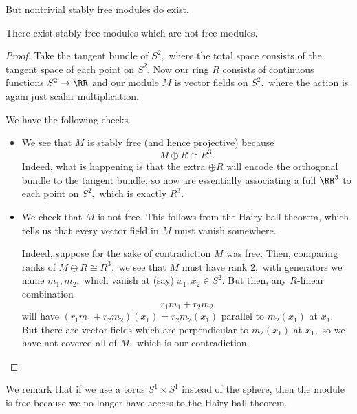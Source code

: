 \documentclass[../notes.tex]{subfiles}
\begin{document}
But nontrivial stably free modules do exist.
\begin{proposition}
	There exist stably free modules which are not free modules.
\end{proposition}
\begin{proof}
	Take the tangent bundle of $S^2,$ where the total space consists of the tangent space of each point on $S^2.$ Now our ring $R$ consists of continuous functions $S^2\to\RR$ and our module $M$ is vector fields on $S^2,$ where the action is again just scalar multiplication.
	
	We have the following checks.
	\begin{itemize}
		\item We see that $M$ is stably free (and hence projective) because
		\[M\oplus R\cong R^3.\]
		Indeed, what is happening is that the extra $\oplus R$ will encode the orthogonal bundle to the tangent bundle, so now are essentially associating a full $\RR^3$ to each point on $S^2,$ which is exactly $R^3.$
		\item We check that $M$ is not free. This follows from the Hairy ball theorem, which tells us that every vector field in $M$ must vanish somewhere.
		
		Indeed, suppose for the sake of contradiction $M$ was free. Then, comparing ranks of $M\oplus R\cong R^3,$ we see that $M$ must have rank $2,$ with generators we name $m_1,m_2,$ which vanish at (say) $x_1,x_2\in S^2.$ But then, any $R$-linear combination
		\[r_1m_1+r_2m_2\]
		will have $(r_1m_1+r_2m_2)(x_1)=r_2m_2(x_1)$ parallel to $m_2(x_1)$ at $x_1.$ But there are vector fields which are perpendicular to $m_2(x_1)$ at $x_1,$ so we have not covered all of $M,$ which is our contradiction.
		\qedhere
	\end{itemize}
\end{proof}
We remark that if we use a torus $S^1\times S^1$ instead of the sphere, then the module is free because we no longer have access to the Hairy ball theorem.
\end{document}
